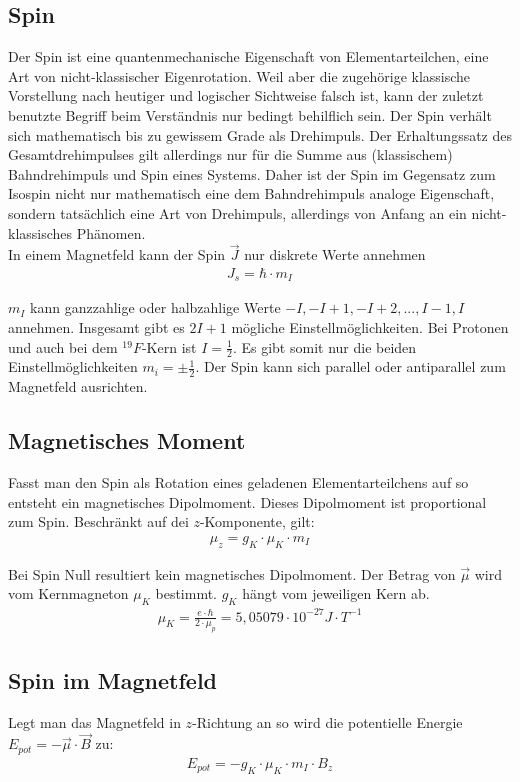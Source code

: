 \documentclass[12pt]{article}
\begin{document}
\subsection{Spin}
Der Spin ist eine quantenmechanische Eigenschaft von Elementarteilchen, eine Art von nicht-klassischer Eigenrotation. Weil aber die zugehörige klassische Vorstellung nach heutiger und logischer Sichtweise falsch ist, kann der zuletzt benutzte Begriff beim Verständnis nur bedingt behilflich sein. Der Spin verhält sich mathematisch bis zu gewissem Grade als Drehimpuls. Der Erhaltungssatz des Gesamtdrehimpulses gilt allerdings nur für die Summe aus (klassischem) Bahndrehimpuls und Spin eines Systems. Daher ist der Spin im Gegensatz zum Isospin nicht nur mathematisch eine dem Bahndrehimpuls analoge Eigenschaft, sondern tatsächlich eine Art von Drehimpuls, allerdings von Anfang an ein nicht-klassisches Phänomen.\\

In einem Magnetfeld kann der Spin $\vec{J}$ nur diskrete Werte annehmen
\begin{align}
 J_s = \hbar \cdot m_{I}
\end{align}

$m_I$ kann ganzzahlige oder halbzahlige Werte $-I, -I+1, -I+2, ..., I-1, I$ annehmen. Insgesamt gibt es $2I+1$ mögliche Einstellmöglichkeiten. Bei Protonen und auch bei dem $^19 F$-Kern ist $I = \frac{1}{2}$. Es gibt somit nur die beiden Einstellmöglichkeiten $m_i = \pm \frac{1}{2}$. Der Spin kann sich parallel oder antiparallel zum Magnetfeld ausrichten.

\subsection{Magnetisches Moment}
Fasst man den Spin als Rotation eines geladenen Elementarteilchens auf so entsteht ein magnetisches Dipolmoment. Dieses Dipolmoment ist proportional zum Spin. Beschränkt auf dei $z$-Komponente, gilt:
\begin{align}
 \mu_z = g_K \cdot \mu_K \cdot m_I
\end{align}

Bei Spin Null resultiert kein magnetisches Dipolmoment. Der Betrag von $\vec\mu$ wird vom Kernmagneton $\mu_K$ bestimmt. $g_K$ hängt vom jeweiligen Kern ab.
\begin{align}
 \mu_K = \frac{e \cdot \hbar}{2 \cdot \mu_p} = 5,05079 \cdot 10^{-27} J \cdot T^{-1}
\end{align}

\subsection{Spin im Magnetfeld}
Legt man das Magnetfeld in $z$-Richtung an so wird die potentielle Energie $E_{pot} = -\vec\mu \cdot \vec B$ zu:
\begin{align}
 E_{pot} = -g_K \cdot \mu_K \cdot m_I \cdot B_z
\end{align}
\end{document}
